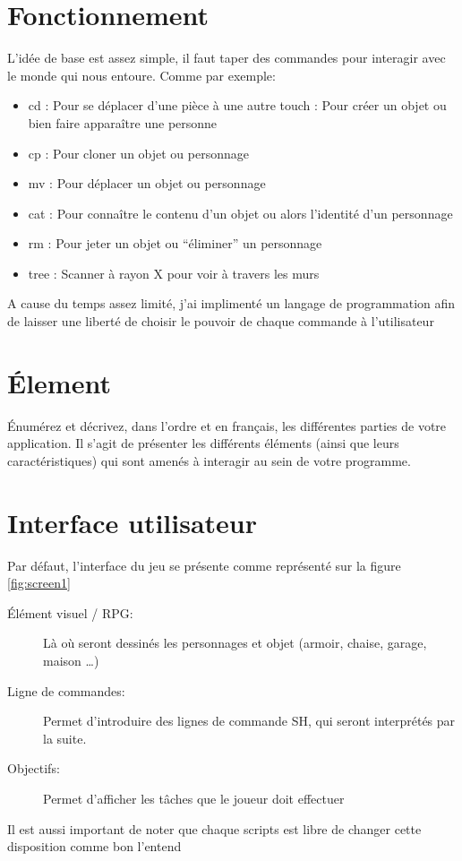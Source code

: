 \documentclass{report}
\begin{document}
\section{Fonctionnement}
L’idée de base est assez simple, il faut taper des commandes pour interagir avec le monde qui nous entoure.
\newline
\newline
Comme par exemple:

\begin {itemize}
  \item cd  : Pour se déplacer d’une pièce à une autre
  touch : Pour créer un objet ou bien faire apparaître une personne
  \item cp : Pour cloner un objet ou personnage
  \item mv : Pour déplacer un objet ou personnage
  \item cat : Pour connaître le contenu d’un objet ou alors l'identité d’un personnage
  \item rm : Pour jeter un objet ou “éliminer” un personnage
  \item tree : Scanner à rayon X pour voir à travers les murs
\end {itemize}

A cause du temps assez limité, j'ai implimenté un langage de programmation afin de laisser une liberté de choisir le pouvoir de chaque commande à l'utilisateur

\section{Élement}
Énumérez et décrivez, dans l’ordre et en français, les différentes parties de votre application. Il s’agit de présenter les différents éléments (ainsi que leurs caractéristiques) qui sont amenés à interagir au sein de votre programme.

\newpage

\section {Interface utilisateur}
Par défaut, l’interface du jeu se présente comme représenté sur la figure \ref{fig:screen1}
\begin{description}
  \item [Élément visuel / RPG:] Là où seront dessinés les personnages et objet (armoir, chaise, garage, maison …)
  \item [Ligne de commandes:] Permet d’introduire des lignes de commande SH, qui seront interprétés par la suite.
  \item [Objectifs:] Permet d’afficher les tâches que le joueur doit effectuer
\end{description}
\par Il est aussi important de noter que chaque scripts est libre de changer cette disposition comme bon
l'entend
\end{document}
